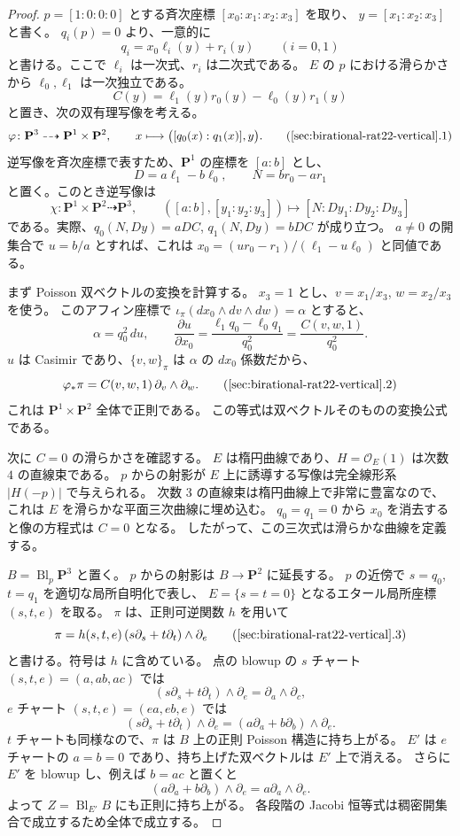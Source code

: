 \begin{proof}
$p=[1:0:0:0]$ とする斉次座標 $[x_0:x_1:x_2:x_3]$ を取り、
$y=[x_1:x_2:x_3]$ と書く。
$q_i(p)=0$ より、一意的に
\[
 q_i=x_0\ell_i(y)+r_i(y)\qquad(i=0,1)
\]
と書ける。ここで $\ell_i$ は一次式、$r_i$ は二次式である。
$E$ の $p$ における滑らかさから $\ell_0,\ell_1$ は一次独立である。
\[
 C(y)=\ell_1(y)r_0(y)-\ell_0(y)r_1(y)
\]
と置き、次の双有理写像を考える。
\[
 \varphi\colon\mathbf P^3\dashrightarrow\mathbf P^1\times\mathbf P^2,
 \qquad x\longmapsto\bigl([q_0(x):q_1(x)],y\bigr).
 \tag{\ref{sec:birational-rat22-vertical}.1}
\]
逆写像を斉次座標で表すため、$\mathbf P^1$ の座標を $[a:b]$ とし、
\[
 D=a\ell_1-b\ell_0,\qquad N=br_0-ar_1
\]
と置く。このとき逆写像は
\[
 \chi\colon\mathbf P^1\times\mathbf P^2\dashrightarrow\mathbf P^3,
 \qquad ([a:b],[y_1:y_2:y_3])
 \longmapsto[N:Dy_1:Dy_2:Dy_3]
\]
である。実際、$q_0(N,Dy)=aDC$, $q_1(N,Dy)=bDC$ が成り立つ。
$a\ne0$ の開集合で $u=b/a$ とすれば、これは
$x_0=(u r_0-r_1)/(\ell_1-u\ell_0)$ と同値である。

まず Poisson 双ベクトルの変換を計算する。
$x_3=1$ とし、$v=x_1/x_3$, $w=x_2/x_3$ を使う。
このアフィン座標で $\iota_\pi(dx_0\wedge dv\wedge dw)=\alpha$ とすると、
\[
 \alpha=q_0^2\,du,
 \qquad
 \frac{\partial u}{\partial x_0}
 =\frac{\ell_1q_0-\ell_0q_1}{q_0^2}
 =\frac{C(v,w,1)}{q_0^2}.
\]
$u$ は Casimir であり、$\{v,w\}_\pi$ は $\alpha$ の $dx_0$ 係数だから、
\[
 \varphi_*\pi
 =C(v,w,1)\,\partial_v\wedge\partial_w.
 \tag{\ref{sec:birational-rat22-vertical}.2}
\]
これは $\mathbf P^1\times\mathbf P^2$ 全体で正則である。
この等式は双ベクトルそのものの変換公式である。

次に $C=0$ の滑らかさを確認する。
$E$ は楕円曲線であり、$H=\mathcal O_E(1)$ は次数 $4$ の直線束である。
$p$ からの射影が $E$ 上に誘導する写像は完全線形系 $|H(-p)|$ で与えられる。
次数 $3$ の直線束は楕円曲線上で非常に豊富なので、これは $E$ を滑らかな平面三次曲線に埋め込む。
$q_0=q_1=0$ から $x_0$ を消去すると像の方程式は $C=0$ となる。
したがって、この三次式は滑らかな曲線を定義する。

$B=\operatorname{Bl}_p\mathbf P^3$ と置く。
$p$ からの射影は $B\to\mathbf P^2$ に延長する。
$p$ の近傍で $s=q_0$, $t=q_1$ を適切な局所自明化で表し、
$E=\{s=t=0\}$ となるエタール局所座標 $(s,t,e)$ を取る。
$\pi$ は、正則可逆関数 $h$ を用いて
\[
 \pi=h(s,t,e)\,(s\partial_s+t\partial_t)\wedge\partial_e
 \tag{\ref{sec:birational-rat22-vertical}.3}
\]
と書ける。符号は $h$ に含めている。
点の blowup の $s$ チャート
$(s,t,e)=(a,ab,ac)$ では
\[
 (s\partial_s+t\partial_t)\wedge\partial_e
 =\partial_a\wedge\partial_c,
\]
$e$ チャート $(s,t,e)=(ea,eb,e)$ では
\[
 (s\partial_s+t\partial_t)\wedge\partial_e
 =(a\partial_a+b\partial_b)\wedge\partial_e.
\]
$t$ チャートも同様なので、$\pi$ は $B$ 上の正則 Poisson 構造に持ち上がる。
$E'$ は $e$ チャートの $a=b=0$ であり、持ち上げた双ベクトルは $E'$ 上で消える。
さらに $E'$ を blowup し、例えば $b=ac$ と置くと
\[
 (a\partial_a+b\partial_b)\wedge\partial_e
 =a\partial_a\wedge\partial_e.
\]
よって $Z=\operatorname{Bl}_{E'}B$ にも正則に持ち上がる。
各段階の Jacobi 恒等式は稠密開集合で成立するため全体で成立する。


\end{proof}
